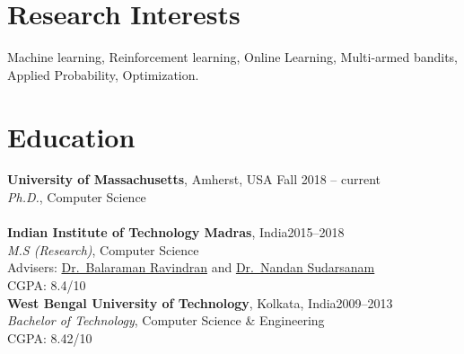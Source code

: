 \documentclass[margin,11pt]{res}
\begin{document}
\begin{resume}

\section{Research Interests}

Machine learning, Reinforcement learning, Online Learning, Multi-armed bandits, Applied Probability, Optimization.

%


\section{Education}
\textbf{University of Massachusetts}, Amherst, USA \hfill Fall 2018 -- current\\
{\sl Ph.D.}, Computer Science \\
\\[0.25cm]
\textbf{Indian Institute of Technology Madras}, India\hfill 2015--2018 \\
{\sl M.S (Research)}, Computer Science \\
Advisers: \href{https://www.cse.iitm.ac.in/~ravi/}{Dr.~Balaraman Ravindran} and \href{https://doms.iitm.ac.in/index.php/nandan-s}{Dr.~Nandan Sudarsanam}\\ CGPA: 8.4/10
\\[0.25cm]
\textbf{West Bengal University of Technology}, Kolkata, India\hfill 2009--2013\\
{\sl Bachelor of Technology}, Computer Science \& Engineering\\ CGPA: 8.42/10

\end{resume}
\end{document}
